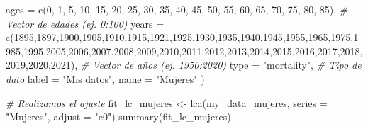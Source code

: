 \documentclass[
]{article}
\newenvironment{Shaded}{\begin{snugshade}}{\end{snugshade}}
\newcommand{\AttributeTok}[1]{\textcolor[rgb]{0.77,0.63,0.00}{#1}}
\newcommand{\CommentTok}[1]{\textcolor[rgb]{0.56,0.35,0.01}{\textit{#1}}}
\newcommand{\DecValTok}[1]{\textcolor[rgb]{0.00,0.00,0.81}{#1}}
\newcommand{\FunctionTok}[1]{\textcolor[rgb]{0.00,0.00,0.00}{#1}}
\newcommand{\NormalTok}[1]{#1}
\newcommand{\OtherTok}[1]{\textcolor[rgb]{0.56,0.35,0.01}{#1}}
\newcommand{\StringTok}[1]{\textcolor[rgb]{0.31,0.60,0.02}{#1}}
\begin{document}
\begin{Shaded}
\begin{Highlighting}[]
  \AttributeTok{ages =} \FunctionTok{c}\NormalTok{(}\DecValTok{0}\NormalTok{, }\DecValTok{1}\NormalTok{, }\DecValTok{5}\NormalTok{, }\DecValTok{10}\NormalTok{, }\DecValTok{15}\NormalTok{, }\DecValTok{20}\NormalTok{, }\DecValTok{25}\NormalTok{, }\DecValTok{30}\NormalTok{, }\DecValTok{35}\NormalTok{, }\DecValTok{40}\NormalTok{, }\DecValTok{45}\NormalTok{, }\DecValTok{50}\NormalTok{, }\DecValTok{55}\NormalTok{, }\DecValTok{60}\NormalTok{, }\DecValTok{65}\NormalTok{, }\DecValTok{70}\NormalTok{, }\DecValTok{75}\NormalTok{, }\DecValTok{80}\NormalTok{, }\DecValTok{85}\NormalTok{),       }\CommentTok{\# Vector de edades (ej. 0:100)}
  \AttributeTok{years =} \FunctionTok{c}\NormalTok{(}\DecValTok{1895}\NormalTok{,}\DecValTok{1897}\NormalTok{,}\DecValTok{1900}\NormalTok{,}\DecValTok{1905}\NormalTok{,}\DecValTok{1910}\NormalTok{,}\DecValTok{1915}\NormalTok{,}\DecValTok{1921}\NormalTok{,}\DecValTok{1925}\NormalTok{,}\DecValTok{1930}\NormalTok{,}\DecValTok{1935}\NormalTok{,}\DecValTok{1940}\NormalTok{,}\DecValTok{1945}\NormalTok{,}\DecValTok{1955}\NormalTok{,}\DecValTok{1965}\NormalTok{,}\DecValTok{1975}\NormalTok{,}\DecValTok{1985}\NormalTok{,}\DecValTok{1995}\NormalTok{,}\DecValTok{2005}\NormalTok{,}\DecValTok{2006}\NormalTok{,}\DecValTok{2007}\NormalTok{,}\DecValTok{2008}\NormalTok{,}\DecValTok{2009}\NormalTok{,}\DecValTok{2010}\NormalTok{,}\DecValTok{2011}\NormalTok{,}\DecValTok{2012}\NormalTok{,}\DecValTok{2013}\NormalTok{,}\DecValTok{2014}\NormalTok{,}\DecValTok{2015}\NormalTok{,}\DecValTok{2016}\NormalTok{,}\DecValTok{2017}\NormalTok{,}\DecValTok{2018}\NormalTok{,}\DecValTok{2019}\NormalTok{,}\DecValTok{2020}\NormalTok{,}\DecValTok{2021}\NormalTok{),        }\CommentTok{\# Vector de años (ej. 1950:2020)}
  \AttributeTok{type =} \StringTok{"mortality"}\NormalTok{,  }\CommentTok{\# Tipo de dato}
  \AttributeTok{label =} \StringTok{"Mis datos"}\NormalTok{,}
  \AttributeTok{name =} \StringTok{"Mujeres"}
\NormalTok{)}

\CommentTok{\# Realizamos el ajuste}
\NormalTok{fit\_lc\_mujeres }\OtherTok{\textless{}{-}} \FunctionTok{lca}\NormalTok{(my\_data\_mujeres, }\AttributeTok{series =} \StringTok{"Mujeres"}\NormalTok{, }\AttributeTok{adjust =} \StringTok{"e0"}\NormalTok{)}
\FunctionTok{summary}\NormalTok{(fit\_lc\_mujeres)}
\end{Highlighting}
\end{Shaded}
\end{document}
